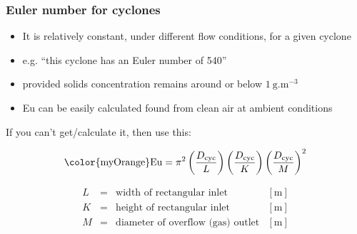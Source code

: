 \begin{frame}\frametitle{{\color{myOrange}Eu}ler number for cyclones}
	\begin{itemize}
		\item	It is relatively constant, under different flow conditions, for a given cyclone
		\item	e.g. ``this cyclone has an Euler number of 540''

		\item	provided solids concentration remains around or below $1~\text{g.m}^{-3}$  %
		\item	{\color{myOrange}Eu} can be easily calculated found from clean air at ambient conditions 
	\end{itemize}
	
	\vspace{12pt}
	If you can't get/calculate it, then use this:
	\begin{exampleblock}{}
		\[\text{{\color{myOrange}Eu}} = \pi^2\left(\dfrac{D_\text{cyc}}{L}\right)\left(\dfrac{D_\text{cyc}}{K}\right)\left(\dfrac{D_\text{cyc}}{M}\right)^2\]
	\end{exampleblock}
	\[
		\begin{array}{rcll}
			L 			&=& \text{width of rectangular inlet} 				&[\text{m}]\\
			K 			&=& \text{height of rectangular inlet} 				&[\text{m}]\\
			M			&=& \text{diameter of overflow (gas) outlet}		& [\text{m}]
		\end{array}
	\]
\end{frame}

